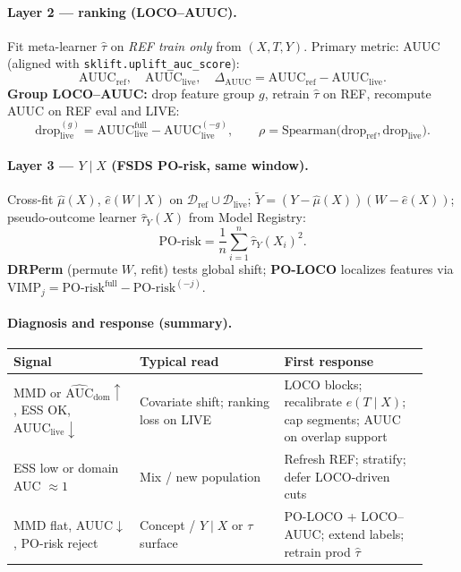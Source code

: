 \documentclass{article}
\begin{document}
\paragraph{Layer 2 --- ranking (LOCO--AUUC).}
Fit meta-learner $\hat\tau$ on \emph{REF train only} from $(X,T,Y)$.
Primary metric: AUUC (aligned with \texttt{sklift.uplift\_auc\_score}):
\[
  \mathrm{AUUC}_{\mathrm{ref}},\quad \mathrm{AUUC}_{\mathrm{live}},\quad
  \Delta_{\mathrm{AUUC}}=\mathrm{AUUC}_{\mathrm{ref}}-\mathrm{AUUC}_{\mathrm{live}}.
\]
\textbf{Group LOCO--AUUC:} drop feature group $g$, retrain $\hat\tau$ on REF, recompute AUUC on REF eval and LIVE:
\[
  \mathrm{drop}_{\mathrm{live}}^{(g)}=\mathrm{AUUC}_{\mathrm{live}}^{\mathrm{full}}-\mathrm{AUUC}_{\mathrm{live}}^{(-g)},\qquad
  \rho=\mathrm{Spearman}\bigl(\mathrm{drop}_{\mathrm{ref}},\mathrm{drop}_{\mathrm{live}}\bigr).
\]

\paragraph{Layer 3 --- $Y\mid X$ (FSDS PO-risk, same window).}
Cross-fit $\hat\mu(X)$, $\hat e(W\mid X)$ on $\mathcal{D}_{\mathrm{ref}}\cup\mathcal{D}_{\mathrm{live}}$;
$\tilde Y=(Y-\hat\mu(X))(W-\hat e(X))$; pseudo-outcome learner $\hat\tau_Y(X)$ from Model Registry:
\[
  \mathrm{PO\text{-}risk}=\frac{1}{n}\sum_{i=1}^n \hat\tau_Y(X_i)^2.
\]
\textbf{DRPerm} (permute $W$, refit) tests global shift; \textbf{PO-LOCO} localizes features via
$\mathrm{VIMP}_j=\mathrm{PO\text{-}risk}^{\mathrm{full}}-\mathrm{PO\text{-}risk}^{(-j)}$.

\paragraph{Diagnosis and response (summary).}
\begin{center}
\small
\begin{tabular}{@{}p{0.28\linewidth}p{0.32\linewidth}p{0.32\linewidth}@{}}
\toprule
Signal & Typical read & First response \\
\midrule
MMD or $\widehat{\mathrm{AUC}}_{\mathrm{dom}}\uparrow$, ESS OK, $\mathrm{AUUC}_{\mathrm{live}}\downarrow$ &
Covariate shift; ranking loss on LIVE &
LOCO blocks; recalibrate $e(T\mid X)$; cap segments; AUUC on overlap support \\
ESS low or domain AUC $\approx 1$ &
Mix / new population &
Refresh REF; stratify; defer LOCO-driven cuts \\
MMD flat, AUUC$\downarrow$, PO-risk reject &
Concept / $Y\mid X$ or $\tau$ surface &
PO-LOCO + LOCO--AUUC; extend labels; retrain prod $\hat\tau$ \\
\bottomrule
\end{tabular}
\end{center}
\end{document}
